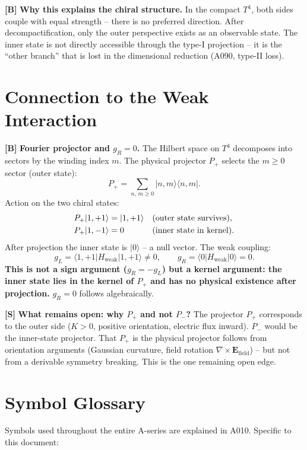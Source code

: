 \textbf{[B]} \textbf{Why this explains the chiral structure.} In the compact
$T^4$, both sides couple with equal strength -- there is no preferred direction.
After decompactification, only the outer perspective exists as an observable
state. The inner state is not directly accessible through the type-I projection
-- it is the ``other branch'' that is lost in the dimensional reduction (A090,
type-II loss).

\section{Connection to the Weak Interaction}

\textbf{[B]} \textbf{Fourier projector and $g_R=0$.} The Hilbert space on $T^4$
decomposes into sectors by the winding index $m$. The physical projector $P_+$
selects the $m\ge0$ sector (outer state):
\[
  P_+ = \sum_{n,\,m\ge0} |n,m\rangle\langle n,m|.
\]
Action on the two chiral states:
\begin{align}
  P_+|1,{+}1\rangle &= |1,{+}1\rangle && \text{(outer state survives)}, \notag\\
  P_+|1,{-}1\rangle &= 0             && \text{(inner state in kernel)}. \notag
\end{align}
After projection the inner state is $|0\rangle$ -- a null vector.
The weak coupling:
\[
  g_L = \langle 1,{+}1|H_\text{weak}|1,{+}1\rangle \neq 0,
  \qquad
  g_R = \langle 0|H_\text{weak}|0\rangle = 0.
\]
\textbf{This is not a sign argument ($g_R=-g_L$) but a kernel argument: the
inner state lies in the kernel of $P_+$ and has no physical existence after
projection.} $g_R=0$ follows algebraically.

\textbf{[S]} \textbf{What remains open: why $P_+$ and not $P_-$?}
The projector $P_+$ corresponds to the outer side ($K>0$, positive orientation,
electric flux inward). $P_-$ would be the inner-state projector. That $P_+$ is
the physical projector follows from orientation arguments (Gaussian curvature,
field rotation $\nabla\times\mathbf{E}_\text{field}$) -- but not from a
derivable symmetry breaking. This is the one remaining open edge.

\section{Symbol Glossary}

Symbols used throughout the entire A-series are explained in A010.
Specific to this document:

